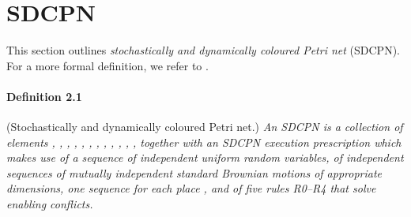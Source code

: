 \documentclass[copyright,creativecommons]{eptcs}
\begin{document}
\section{SDCPN}\label{sec:sdcpn}
This section outlines \emph{stochastically and
dynamically coloured Petri net} (SDCPN). For a more formal
definition, we refer to \cite{EverdijBlom2009}.

\paragraph{Definition 2.1} (Stochastically and dynamically coloured Petri net.)
\emph{An SDCPN is a collection of elements , ,
, , , , , , , , , , together
with an SDCPN execution prescription which makes use of a sequence
 of independent uniform 
random variables, of independent sequences of mutually independent
standard Brownian motions 
of appropriate dimensions, one sequence for each place , and of
five rules R0--R4 that solve enabling conflicts.}
\end{document}
